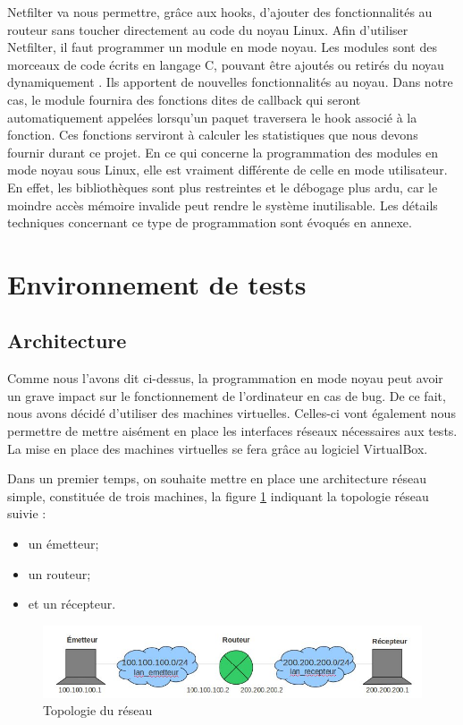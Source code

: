\documentclass[a4paper]{article}
\begin{document}
Netfilter va nous permettre, grâce aux hooks, d'ajouter des fonctionnalités au routeur 
sans toucher directement au code du noyau Linux. Afin d'utiliser Netfilter, il faut 
programmer un module en mode noyau. Les modules sont des morceaux de code écrits en 
langage C, pouvant être ajoutés ou retirés du noyau dynamiquement \cite{module1}. Ils apportent de 
nouvelles fonctionnalités au noyau. Dans notre cas, le module fournira des fonctions 
dites de callback qui seront automatiquement appelées lorsqu'un paquet traversera le 
hook associé à la fonction. Ces fonctions serviront à calculer les statistiques que 
nous devons fournir durant ce projet.
En ce qui concerne la programmation des modules en mode noyau sous Linux, elle est 
vraiment différente de celle en mode utilisateur. En effet, les bibliothèques sont 
plus restreintes et le débogage plus ardu, car le moindre accès mémoire invalide peut 
rendre le système inutilisable. Les détails techniques concernant ce type de programmation 
sont évoqués en annexe.

\section{Environnement de tests}

\subsection{Architecture}

Comme nous l'avons dit ci-dessus, la programmation en mode noyau peut avoir un grave 
impact sur le fonctionnement de l'ordinateur en cas de bug. De ce fait, nous avons 
décidé d'utiliser des machines virtuelles. Celles-ci vont également nous permettre 
de mettre aisément en place les interfaces réseaux nécessaires aux tests. La mise en 
place des machines virtuelles se fera grâce au logiciel VirtualBox\cite{virtbox}.

Dans un premier temps, on souhaite mettre en place une
architecture réseau simple, constituée de trois machines, la
figure \ref{topo} indiquant la topologie réseau suivie :
\begin{itemize}
	\item un émetteur;
	\item un routeur;
	\item et un récepteur.
\end{itemize}

\begin{figure}[!ht]
	\centering
	\includegraphics[scale=.5]{topo.jpg}
	\caption{\label{topo} Topologie du réseau}
\end{figure}
\end{document}
